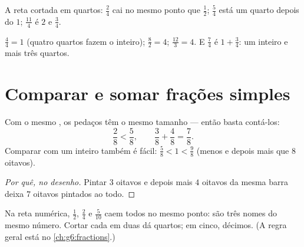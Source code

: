 \begin{omfigure}

{\small A reta cortada em quartos: $\frac24$ cai no mesmo ponto que
$\frac12$; $\frac54$ está um quarto depois do $1$; $\frac{11}{4}$ é
$2$ e $\frac34$.}
\end{omfigure}

\begin{example}\label{ex:g4:fractions:whole}
$\frac44 = 1$ (quatro quartos fazem o inteiro); $\frac82 = 4$;
$\frac{12}{3} = 4$. E $\frac74$ é $1 + \frac34$: um inteiro e mais
três quartos.
\end{example}

\section{Comparar e somar frações simples}

\begin{proposition}\label{prop:g4:fractions:compare}
Com o mesmo , os pedaços têm o mesmo tamanho --- então
basta contá-los:
\[
\frac{2}{8} < \frac{5}{8},
\qquad
\frac{3}{8} + \frac{4}{8} = \frac{7}{8}.
\]
Comparar com um inteiro também é fácil: $\frac{5}{8} < 1 <
\frac{9}{8}$ (menos e depois mais que $8$ oitavos).
\end{proposition}

\begin{proof}[Por quê, no desenho]
Pintar $3$ oitavos e depois mais $4$ oitavos da mesma barra deixa $7$
oitavos pintados ao todo.
\end{proof}

\begin{example}\label{ex:g4:fractions:equal}
Na reta numérica, $\frac12$, $\frac24$ e $\frac{5}{10}$ caem todos no
mesmo ponto: são três nomes do mesmo número. Cortar cada  em
duas dá quartos; em cinco, décimos. (A regra geral está no
\cref{ch:g6:fractions}.)
\end{example}

